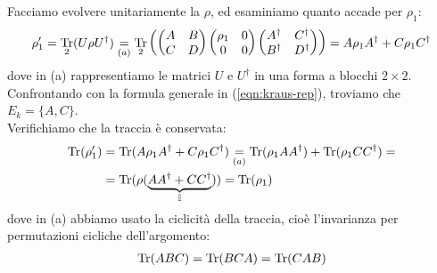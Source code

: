 \documentclass[../../InformazioneQuantistica.tex]{subfiles}
\begin{document}
Facciamo evolvere unitariamente la $\rho$, ed esaminiamo quanto accade per $\rho_1$:
\begin{align*}
\rho_1' = \underset{2}{\operatorname{Tr}}(U\rho U^\dag) \underset{(a)}{=} \underset{2}{\operatorname{Tr}} \left(\begin{pmatrix}A & B\\ C & D \end{pmatrix} \begin{pmatrix} \rho_1 & 0\\ 0 & 0 \end{pmatrix}\begin{pmatrix} A^\dag & C^\dag\\ B^\dag & D^\dag \end{pmatrix}\right) = A \rho_1 A^\dag + C \rho_1 C^\dag
\end{align*}
dove in (a) rappresentiamo le matrici $U$ e $U^\dag$ in una forma a blocchi $2\times 2$.\\

Confrontando con la formula generale in (\ref{eqn:kraus-rep}), troviamo che $E_k = \{A,C\}$.\\
Verifichiamo che la traccia è conservata:
\begin{align*}
\operatorname{Tr}(\rho_1') &= \operatorname{Tr}(A\rho_1 A^\dag + C\rho_1 C^\dag) \underset{(a)}{=} \operatorname{Tr}(\rho_1 A A^\dag) + \operatorname{Tr}(\rho_1 CC^\dag) =\\
&= \operatorname{Tr}(\rho(\underbrace{AA^\dag + CC^\dag}_{\mathbb{I}})) = \operatorname{Tr}(\rho_1)
\end{align*}
dove in (a) abbiamo usato la ciclicità della traccia, cioè l'invarianza per permutazioni cicliche dell'argomento:
\begin{align*}
\operatorname{Tr}(ABC)=\operatorname{Tr}(BCA) = \operatorname{Tr}(CAB)
\end{align*}

\begin{comment}
Con operazioni di questo tipo possiamo esplorare stati \q{all'interno} della sfera di Bloch, considerando quindi un'evoluzione non unitaria, dato che si perde la reversibilità. Per esempio, l'origine della sfera di Bloch corrisponde allo stato massimamente misto, e chiaramente un'evoluzione che porta dalla superficie della sfera di Bloch all'origine non può essere reversibile, dato che l'informazione del punto di partenza viene persa nel tragitto.
\end{comment}
\end{document}
